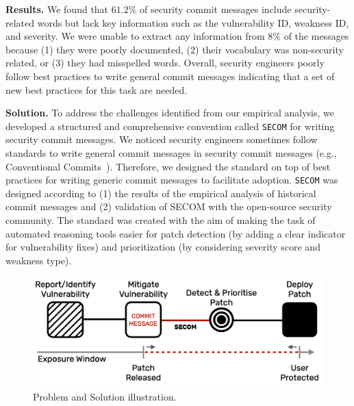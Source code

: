 \textbf{Results.} We found that $61.2\%$ of security commit messages include security-related words but lack key information such as the vulnerability ID, weakness ID, and severity. We were unable to extract any information from $8\%$ of the messages because (1) they were poorly documented, (2) their vocabulary was non-security related, or (3) they had misspelled words. Overall, security engineers poorly follow best practices to write general commit messages indicating that a set of new best practices for this task are needed. 

\textbf{Solution.} To address the challenges identified from our empirical analysis, we developed a structured and comprehensive convention called \texttt{SECOM} for writing security commit messages. We noticed 
security engineers sometimes follow standards to write general commit messages in security commit messages (e.g., Conventional Commits~\cite{convcom}). Therefore, we designed the standard
on top of best practices for writing generic commit messages to facilitate adoption. \texttt{SECOM} was designed according to (1) the results of the empirical analysis of historical commit messages and (2) validation of SECOM with the open-source security community. The standard was created with the aim of making the task of automated reasoning tools easier for patch detection (by adding a clear indicator for vulnerability fixes) and prioritization (by considering severity score and weakness type). 

\begin{figure}[!t]
    \centering
\includegraphics[width=\linewidth]{Figures/cycle.png}
    \caption{Problem and Solution illustration.}\label{fig:cycle}
\end{figure}

